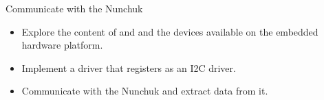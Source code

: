 \setuplabframe
{Communicate with the Nunchuk}
{
  \begin{itemize}
  \item Explore the content of  and  and the
    devices available on the embedded hardware platform.
  \item Implement a driver that registers as an I2C driver.
  \item Communicate with the Nunchuk and extract data from it.
  \end{itemize}
}
